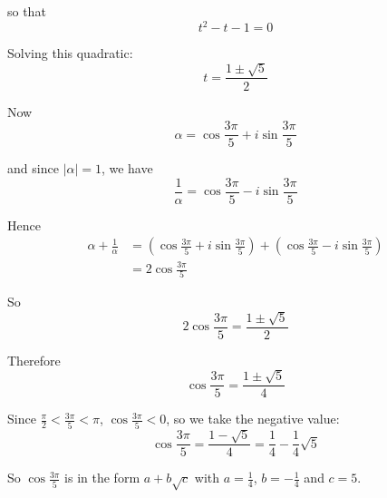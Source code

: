 \documentclass[leqno]{article}
\begin{document}
\begin{enumerate}[
  label=\textbf{\arabic*.},
  leftmargin=*,
  topsep=0pt,
  partopsep=0pt,
  parsep=0pt
]
\begin{djsSolution}
\begin{enumerate}[label=\textbf{(\alph*)}]
so that
\[
t^2-t-1=0
\]

Solving this quadratic:
\[
t=\frac{1\pm\sqrt{5}}{2}
\]

Now
\[
\alpha=\cos\frac{3\pi}{5}+i\sin\frac{3\pi}{5}
\]

and since $|\alpha|=1$, we have
\[
\frac{1}{\alpha}=\cos\frac{3\pi}{5}-i\sin\frac{3\pi}{5}
\]

Hence
\begin{align*}
\alpha+\frac{1}{\alpha}
&=\left(\cos\frac{3\pi}{5}+i\sin\frac{3\pi}{5}\right)+\left(\cos\frac{3\pi}{5}-i\sin\frac{3\pi}{5}\right) \\
&=2\cos\frac{3\pi}{5}
\end{align*}

So
\[
2\cos\frac{3\pi}{5}=\frac{1\pm\sqrt{5}}{2}
\]

Therefore
\[
\cos\frac{3\pi}{5}=\frac{1\pm\sqrt{5}}{4}
\]

Since $\frac{\pi}{2}<\frac{3\pi}{5}<\pi$, $\cos\frac{3\pi}{5}<0$, so we take the negative value:
\[
\cos\frac{3\pi}{5}=\frac{1-\sqrt{5}}{4}=\frac14-\frac14\sqrt5
\]

So $\cos\frac{3\pi}{5}$ is in the form $a+b\sqrt{c}$ with $a=\frac14$, $b=-\frac14$ and $c=5$.
\end{enumerate}
\end{djsSolution}


\newpage

\questionitem


\end{enumerate}
\end{document}
